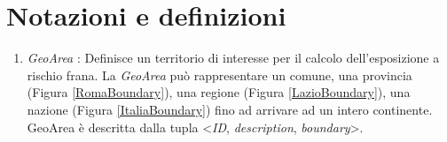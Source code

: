 
\chapter{Notazioni e definizioni} %

\label{ch:notazioni} %

\begin{enumerate}
	
	\item \label{def:geoarea} \textit{GeoArea} : Definisce un territorio di interesse per il calcolo dell'esposizione a rischio frana. La \textit{GeoArea} può rappresentare un comune, una provincia (Figura \ref{RomaBoundary}), una regione (Figura \ref{LazioBoundary}), una nazione (Figura \ref{ItaliaBoundary}) fino ad arrivare ad un intero continente. GeoArea è descritta dalla tupla <\textit{ID}, \textit{description}, \textit{boundary}>.
	

\end{enumerate}
